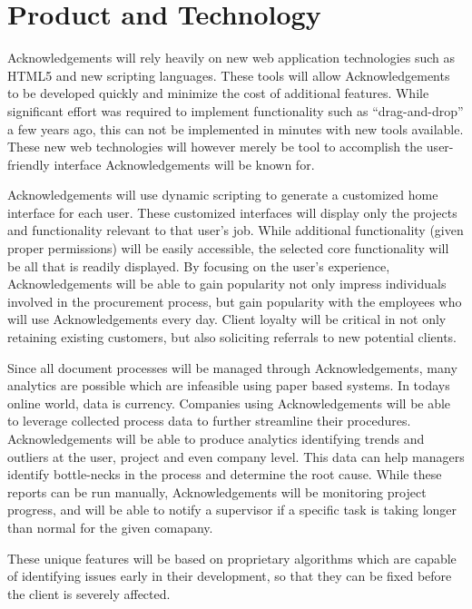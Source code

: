 \section{Product and Technology}
Acknowledgements will rely heavily on new web application technologies such as HTML5 and new scripting languages. These tools will allow Acknowledgements to be developed quickly and minimize the cost of additional features. While significant effort was required to implement functionality such as ``drag-and-drop'' a few years ago, this can not be implemented in minutes with new tools available. These new web technologies will however merely be tool to accomplish the user-friendly interface Acknowledgements will be known for.

Acknowledgements will use dynamic scripting to generate a customized home interface for each user. These customized interfaces will display only the projects and functionality relevant to that user's job. While additional functionality (given proper permissions) will be easily accessible, the selected core functionality will be all that is readily displayed. By focusing on the user's experience, Acknowledgements will be able to gain popularity not only impress individuals involved in the procurement process, but gain popularity with the employees who will use Acknowledgements every day. Client loyalty will be critical in not only retaining existing customers, but also soliciting referrals to new potential clients.

Since all document processes will be managed through Acknowledgements, many analytics are possible which are infeasible using paper based systems. In todays online world, data is currency. Companies using Acknowledgements will be able to leverage collected process data to further streamline their procedures. Acknowledgements will be able to produce analytics identifying trends and outliers at the user, project and even company level. This data can help managers identify bottle-necks in the process and determine the root cause. While these reports can be run manually, Acknowledgements will be monitoring project progress, and will be able to notify a supervisor if a specific task is taking longer than normal for the given comapany.

These unique features will be based on proprietary algorithms which are capable of identifying issues early in their development, so that they can be fixed before the client is severely affected.
